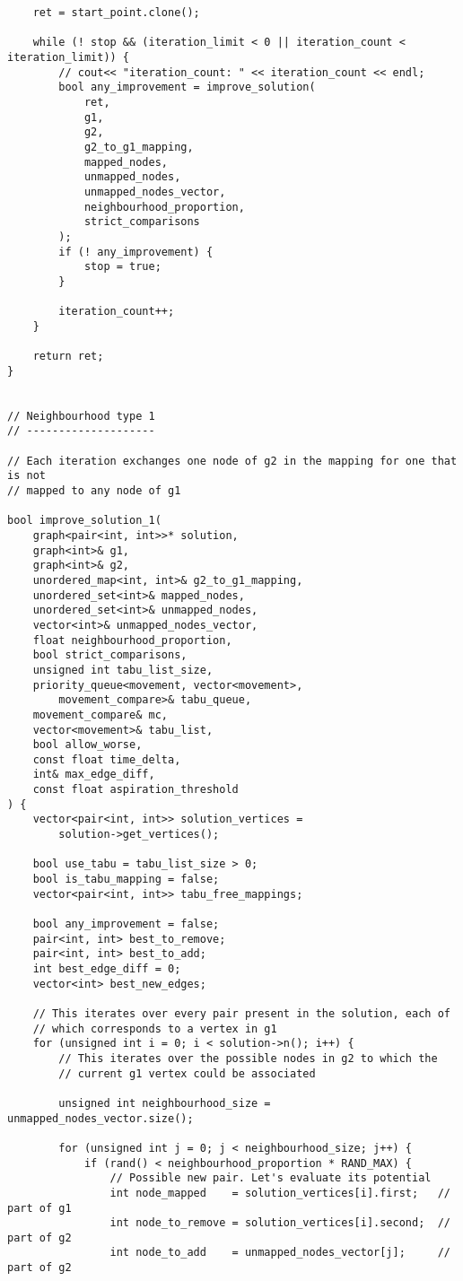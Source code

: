 \begin{lstlisting}
    ret = start_point.clone();

    while (! stop && (iteration_limit < 0 || iteration_count < iteration_limit)) {
        // cout<< "iteration_count: " << iteration_count << endl;
        bool any_improvement = improve_solution(
            ret,
            g1,
            g2,
            g2_to_g1_mapping,
            mapped_nodes,
            unmapped_nodes,
            unmapped_nodes_vector,
            neighbourhood_proportion,
            strict_comparisons
        );
        if (! any_improvement) {
            stop = true;
        }

        iteration_count++;
    }

    return ret;
}


// Neighbourhood type 1
// --------------------

// Each iteration exchanges one node of g2 in the mapping for one that is not
// mapped to any node of g1

bool improve_solution_1(
    graph<pair<int, int>>* solution,
    graph<int>& g1,
    graph<int>& g2,
    unordered_map<int, int>& g2_to_g1_mapping,
    unordered_set<int>& mapped_nodes,
    unordered_set<int>& unmapped_nodes,
    vector<int>& unmapped_nodes_vector,
    float neighbourhood_proportion,
    bool strict_comparisons,
    unsigned int tabu_list_size,
    priority_queue<movement, vector<movement>,
        movement_compare>& tabu_queue,
    movement_compare& mc,
    vector<movement>& tabu_list,
    bool allow_worse,
    const float time_delta,
    int& max_edge_diff,
    const float aspiration_threshold
) {
    vector<pair<int, int>> solution_vertices =
        solution->get_vertices();

    bool use_tabu = tabu_list_size > 0;
    bool is_tabu_mapping = false;
    vector<pair<int, int>> tabu_free_mappings;

    bool any_improvement = false;
    pair<int, int> best_to_remove;
    pair<int, int> best_to_add;
    int best_edge_diff = 0;
    vector<int> best_new_edges;

    // This iterates over every pair present in the solution, each of
    // which corresponds to a vertex in g1
    for (unsigned int i = 0; i < solution->n(); i++) {
        // This iterates over the possible nodes in g2 to which the
        // current g1 vertex could be associated

        unsigned int neighbourhood_size = unmapped_nodes_vector.size();

        for (unsigned int j = 0; j < neighbourhood_size; j++) {
            if (rand() < neighbourhood_proportion * RAND_MAX) {
                // Possible new pair. Let's evaluate its potential
                int node_mapped    = solution_vertices[i].first;   // part of g1
                int node_to_remove = solution_vertices[i].second;  // part of g2
                int node_to_add    = unmapped_nodes_vector[j];     // part of g2


\end{lstlisting}
